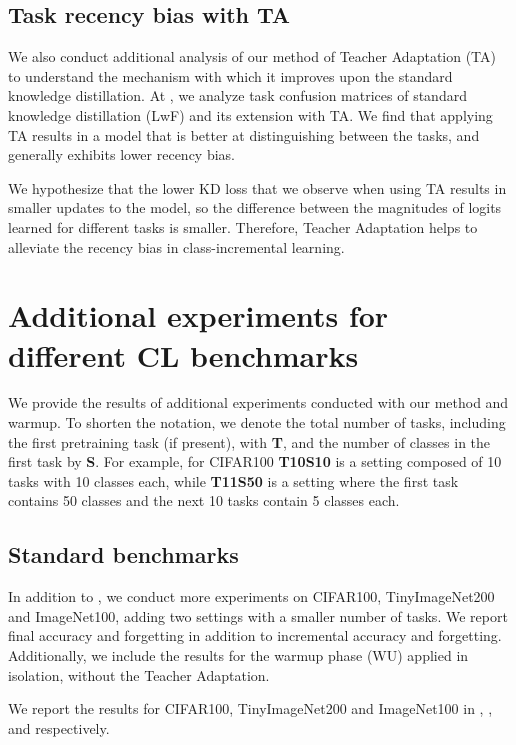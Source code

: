 \begin{appendix}
\subsection{Task recency bias with TA}
We also conduct additional analysis of our method of Teacher Adaptation (TA) to understand the mechanism with which it improves upon the standard knowledge distillation. At , we analyze task confusion matrices of standard knowledge distillation (LwF) and its extension with TA.  We find that applying TA results in a model that is better at distinguishing between the tasks, and generally exhibits lower recency bias. 

We hypothesize that the lower KD loss that we observe when using TA results in smaller updates to the model, so the difference between the magnitudes of logits learned for different tasks is smaller. Therefore, Teacher Adaptation helps to alleviate the recency bias in class-incremental learning.


\section{Additional experiments for different CL benchmarks}
\label{sec:app:experiments}
We provide the results of additional experiments conducted with our method and warmup. To shorten the notation, we denote the total number of tasks, including the first pretraining task (if present), with \textbf{T}, and the number of classes in the first task by \textbf{S}. For example, for CIFAR100 \textbf{T10S10} is a setting composed of 10 tasks with 10 classes each, while \textbf{T11S50} is a setting where the first task contains 50 classes and the next 10 tasks contain 5 classes each.

\subsection{Standard benchmarks}
In addition to , we conduct more experiments on CIFAR100, TinyImageNet200 and ImageNet100, adding two settings with a smaller number of tasks. We report final accuracy and forgetting in addition to incremental accuracy and forgetting. Additionally, we include the results for the warmup phase (WU) applied in isolation, without the Teacher Adaptation.

We report the results for CIFAR100, TinyImageNet200 and ImageNet100 in , , and  respectively.


\end{appendix}
